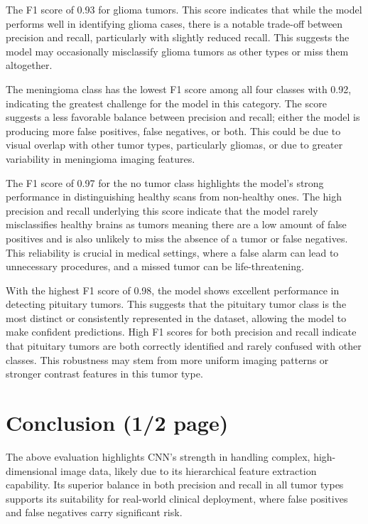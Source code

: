 \documentclass[conference]{IEEEtran}
\begin{document}
The F1 score of 0.93 for glioma tumors. This score indicates that while the model performs well in identifying glioma cases, there is a notable trade-off between precision and recall, particularly with slightly reduced recall. This suggests the model may occasionally misclassify glioma tumors as other types or miss them altogether.

The meningioma class has the lowest F1 score among all four classes with 0.92, indicating the greatest challenge for the model in this category. The score suggests a less favorable balance between precision and recall; either the model is producing more false positives, false negatives, or both. This could be due to visual overlap with other tumor types, particularly gliomas, or due to greater variability in meningioma imaging features. 

The F1 score of 0.97 for the no tumor class highlights the model’s strong performance in distinguishing healthy scans from non-healthy ones. The high precision and recall underlying this score indicate that the model rarely misclassifies healthy brains as tumors meaning there are a low amount of false positives and is also unlikely to miss the absence of a tumor or false negatives. This reliability is crucial in medical settings, where a false alarm can lead to unnecessary procedures, and a missed tumor can be life-threatening.

With the highest F1 score of 0.98, the model shows excellent performance in detecting pituitary tumors. This suggests that the pituitary tumor class is the most distinct or consistently represented in the dataset, allowing the model to make confident predictions. High F1 scores for both precision and recall indicate that pituitary tumors are both correctly identified and rarely confused with other classes. This robustness may stem from more uniform imaging patterns or stronger contrast features in this tumor type.

\section{\large Conclusion (1/2 page)}

The above evaluation highlights CNN's strength in handling complex, high-dimensional image data, likely due to its hierarchical feature extraction capability. Its superior balance in both precision and recall in all tumor types supports its suitability for real-world clinical deployment, where false positives and false negatives carry significant risk.
\end{document}
